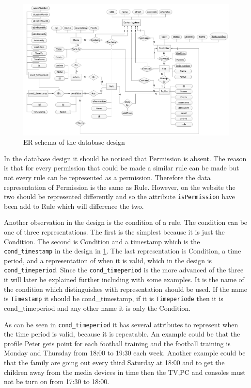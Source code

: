 \begin{figure}
	\centering
		\includegraphics[width=1.00\textwidth]{images/ERdiagram.jpg}
	\caption{ER schema of the database design}
	\label{fig:ERdiagram}
\end{figure}

In the database design it should be noticed that Permission is absent. The reason is that for every permission that could be made a similar rule can be made but not every rule can be represented as a permission. Therefore the data representation of Permission is the same as Rule. However, on the website the two should be represented differently and so the attribute \texttt{isPermission} have been add to Rule which will difference the two.

Another observation in the design is the condition of a rule. The condition can be one of three representations. The first is the simplest because it is just the Condition. The second is Condition and a timestamp which is the \texttt{cond\_timestamp} in the design in \ref{fig:ERdiagram}. The last representation is Condition, a time period, and a representation of when it is valid, which in the design is \texttt{cond\_timeperiod}. Since the \texttt{cond\_timeperiod} is the more advanced of the three it will later be explained further including with some examples. It is the name of the condition which distinguishes with representation should be used. If the name is \texttt{Timestamp} it should be cond\_timestamp, if it is \texttt{Timeperiode} then it is cond\_timeperiod and any other name it is only the Condition.


As can be seen in \texttt{cond\_timeperiod} it has several attributes to represent when the time period is valid, because it is repeatable. An example could be that the profile Peter gets point for each football training and the football training is Monday and Thursday from 18:00 to 19:30 each week. Another example could be that the family are going out every third Saturday at 18:00 and to get the children away from the media devices in time then the TV,PC and consoles must not be turn on from 17:30 to 18:00. 

